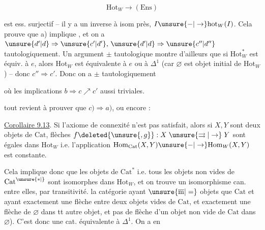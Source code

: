 \[
 \mathrm{Hot}_{W}\longrightarrow(\mathrm{Ens})
\]

est ess. surjectif -- il y a un inverse à isom
près, $I\unsure{-|\to}\mathrm{hot}_{W}(I)$. Cela prouve que
a) implique , et on a $\unsure{d'|d}\Rightarrow\unsure{c'|d'},\,\unsure{d'|d}\Rightarrow\unsure{c''|d''}$
tautologiquement. Un argument $\pm$ tautologique
montre d'ailleurs que si $\mathrm{Hot}_{W}^{*}$ est équiv. à $e$,
alors $\mathrm{Hot}_{W}$ est équivalente à $e$ ou à $\Delta^1$
(car $\varnothing$ est objet initial de $\mathrm{Hot}_{W}$) -- donc $c''\Rightarrow c'$.
Donc on a $\pm$ tautologiquement


où les implications $b\Rightarrow c\nearrow c'$  
aussi triviales. 

tout revient à prouver que $c)\Rightarrow a)$, ou encore :

\uline{Corollaire 9.13}. Si l'axiome de connexité n'est pas
satisfait, alors  si $X,Y$ sont deux objets de $\mathrm{Cat}$,
  flèches $f\deleted{\unsure{,g}}:X\mathrel{\unsure{\rightrightarrows|\to}}Y$  sont  égales dans
$\mathrm{Hot}_{W}$ i.e. l'application $\mathrm{Hom}_{\mathrm{Cat}}(X,Y)\unsure{-|\to}\mathrm{Hom}_{W}(X,Y)$ est
constante.

Cela implique donc que  les objets de $\mathrm{Cat}^*$ i.e.
tous les objets non vides de $\mathrm{Cat}^{\unsure{*|{}}}$ sont isomorphes
dans $\mathrm{Hot}_{W}$, et on trouve un isomorphisme can.
entre elles,  par transitivité. 
  la catégorie  ayant $\unsure{\overline{\mathrm m}|=}$ objets que $\mathrm{Cat}$
et ayant exactement une flèche entre deux objets
 vides de $\mathrm{Cat}$, et exactement une flèche de $\varnothing$
dans tt autre objet, et pas de flèche d'un objet
non vide de $\mathrm{Cat}$ dans $\varnothing$). C'est donc une cat. équivalente
à $\Delta^1$. On a  
en

